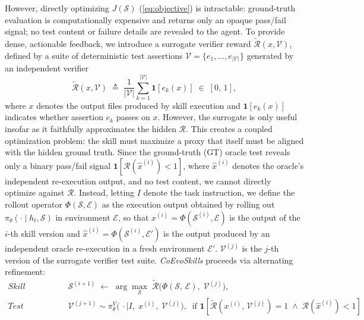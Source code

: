 \documentclass{article}
\newcommand{\method}{\textit{CoEvoSkills}\xspace}
\newcommand{\skill}{\mathcal{S}}
\begin{document}
However, directly optimizing $J(\skill)$ (\autoref{eq:objective}) is intractable: ground-truth evaluation is computationally expensive and returns only an opaque pass/fail signal; no test content or failure details are revealed to the agent. To provide dense, actionable feedback, we introduce a surrogate verifier reward $\tilde{\mathcal{R}}(x, \mathcal{V})$, defined by a suite of deterministic test assertions $\mathcal{V} = \{e_1, \ldots, e_{|\mathcal{V}|}\}$ generated by an independent verifier
\begin{equation}
    \tilde{\mathcal{R}}(x, \mathcal{V}) \;\triangleq\; \frac{1}{|\mathcal{V}|}\sum_{k=1}^{|\mathcal{V}|}\mathbf{1}\!\left[e_k(x)\right] \;\in\; [0,\, 1],
    \label{eq:proxy_reward}
\end{equation}
where $x$ denotes the output files produced by skill execution and $\mathbf{1}[e_k(x)]$ indicates whether assertion $e_k$ passes on $x$. However, the surrogate is only useful insofar as it faithfully approximates the hidden $\mathcal{R}$. This creates a coupled optimization problem: the skill must maximize a proxy that itself must be aligned with the hidden ground truth. Since the ground-truth (GT) oracle test reveals only a binary pass/fail signal $\mathbf{1}[\mathcal{R}(\hat{x}^{(i)}) < 1]$, where $\hat{x}^{(i)}$ denotes the oracle's independent re-execution output, and no test content, we cannot directly optimize against $\mathcal{R}$. Instead, letting $I$ denote the task instruction, we define the rollout operator $\Phi(\skill, \mathcal{E})$ as the execution output obtained by rolling out $\pi_\theta(\cdot \mid h_t, \skill)$ in environment $\mathcal{E}$, so that $x^{(i)} = \Phi(\skill^{(i)}, \mathcal{E})$ is the output of the $i$-th skill version and $\hat{x}^{(i)} = \Phi(\skill^{(i)}, \mathcal{E}')$ is the output produced by an independent oracle re-execution in a fresh environment $\mathcal{E}'$. $\mathcal{V}^{(j)}$ is the $j$-th version of the surrogate verifier test suite. \method proceeds via alternating refinement:
\begin{align}
    \textit{Skill refinement:} \quad & \skill^{(i+1)} \;\leftarrow\; \arg\max_{\skill}\; \tilde{\mathcal{R}}\!\bigl(\Phi(\skill,\,\mathcal{E}),\; \mathcal{V}^{(j)}\bigr), \label{eq:skill_opt} \\
    \textit{Test escalation:} \quad & \mathcal{V}^{(j+1)} \sim \pi_\theta^{V}\!\bigl(\,\cdot \mid I,\; x^{(i)},\; \mathcal{V}^{(j)}\bigr), \;\; \text{if } \mathbf{1}\!\left[\tilde{\mathcal{R}}(x^{(i)},\, \mathcal{V}^{(j)}) {=} 1 \;\wedge\; \mathcal{R}(\hat{x}^{(i)}) {<} 1\right] \label{eq:test_opt}
\end{align}
\end{document}
